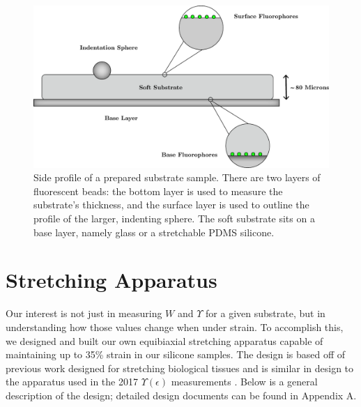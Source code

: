 \begin{figure}[h!]
	\centering
	\includegraphics[width=.8\linewidth]{Chapters/Figures/substrate_graphic_new}
	\caption[Prepared Substrate Profile]{Side profile of a prepared substrate sample. There are two layers of fluorescent beads: the bottom layer is used to measure the substrate's thickness, and the surface layer is used to outline the profile of the larger, indenting sphere. The soft substrate sits on a base layer, namely glass or a stretchable PDMS silicone.}
	\label{fig:substrategraphic}
\end{figure}

\section{Stretching Apparatus}
Our interest is not just in  measuring $W$ and $\Upsilon$ for a given substrate, but in understanding how those values change when under strain. To accomplish this, we designed and built our own equibiaxial stretching apparatus capable of maintaining up to 35\% strain in our silicone samples. The design is based off of previous work designed for stretching biological tissues \cite{na2008time} and is similar in design to the apparatus used in the 2017 $\Upsilon(\epsilon)$ measurements \cite{xu2017direct}. Below is a general description of the design; detailed design documents can be found in Appendix A.

